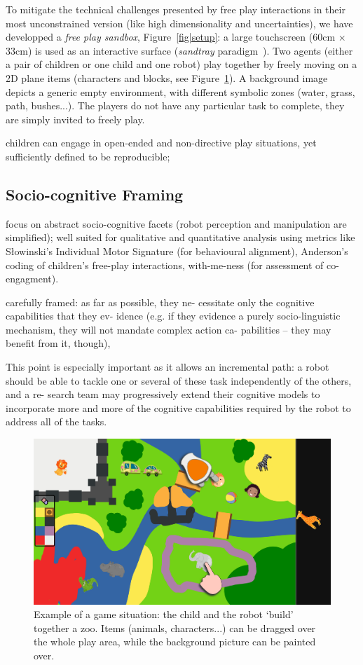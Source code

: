 \documentclass{article}
\begin{document}
To mitigate the technical challenges presented by free play interactions in
their most unconstrained version (like
high dimensionality and uncertainties), we have developped a \emph{free play
sandbox}, Figure~\ref{fig|setup}: a large touchscreen (60cm $\times$ 33cm) is
used as an interactive surface (\emph{sandtray}
paradigm~\cite{baxter2012touchscreen}). Two agents (either a pair of children or
one child and one robot) play together by freely moving on a 2D plane items
(characters and blocks, see Figure~\ref{fig|sandbox}). A background image
depicts a generic empty environment, with different symbolic zones (water,
grass, path, bushes...). The players do not have any particular task to
complete, they are simply invited to freely play.


children can engage in open-ended and
non-directive play situations, yet sufficiently
defined to be reproducible; 

\subsection{Socio-cognitive Framing}

focus on abstract socio-cognitive facets (robot
perception and manipulation are simplified); well suited for qualitative and
quantitative analysis using metrics like Słowinski’s Individual Motor Signature
(for behavioural alignment), Anderson's~\cite{anderson2004social} coding of children’s free-play
interactions, with-me-ness (for assessment of co-engagment).

carefully framed: as far as possible, they ne-
cessitate only the cognitive capabilities that they ev-
idence (e.g. if they evidence a purely socio-linguistic
mechanism, they will not mandate complex action ca-
pabilities – they may benefit from it, though),

This point is especially important as it allows an
incremental path: a robot should be able to tackle one or
several of these task independently of the others, and a re-
search team may progressively extend their cognitive models
to incorporate more and more of the cognitive capabilities
required by the robot to address all of the tasks.


\begin{figure}
    \centering
    \includegraphics[width=0.9\linewidth]{sandbox}
    \caption{Example of a game situation: the child and the robot `build'
    together a zoo. Items (animals, characters...) can be dragged over the whole
    play area, while the background picture can be painted over.}
    \label{fig|sandbox}
\end{figure}
\end{document}
